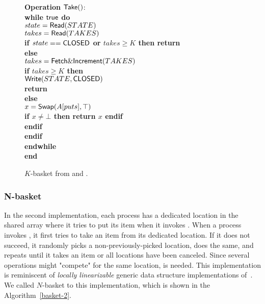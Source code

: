 \begin{figure}[ht!]
{{\begin{minipage}[t]{180mm}
\begin{tabbing}
{\bf Operation} ${\sf Take}()$: \\
 \> {\bf while \({\sf true}\) do}\\
 \> \> \(state = {\sf Read}(STATE)\) \\
 \> \> \(takes = {\sf Read}(TAKES)\) \\
 \> \> {\bf if \(state == {\sf CLOSED}\) or \(takes \geq K\) then return \closed} \\
 \> \> {\bf else} \\
 \> \> \> \(takes = {\sf Fetch\&Increment}(TAKES)\) \\
 \> \> \> {\bf if \(takes \geq K\) then} \\
 \> \> \> \> \({\sf Write}(STATE, {\sf CLOSED})\) \\
 \> \> \> \> \textbf{return} \closed \\
 \> \> \> {\bf else} \\
 \> \> \> \> \(x = {\sf Swap}(A[puts], \top)\) \\
 \> \> \> \> {\bf if \(x \neq \bot\) then return \(x\) endif} \\
 \> \> \> {\bf endif} \\
 \> \> {\bf endif} \\
 \> {\bf endwhile}\\
{\bf end \Take}
\end{tabbing}
\end{minipage}}
\caption{\label{basket-1}$K$-basket from \FAI and \SWAP.}
}
\end{figure}

\subsubsection{N-basket}

In the second implementation, each process has a dedicated location in the shared array where it tries to put its item when it invokes \Put. When a process invokes \Take, it first tries to take an item from its dedicated location. If it does not succeed, it randomly picks a non-previously-picked location, does the same, and repeats until it takes an item or all locations have been canceled. Since several operations might "compete" for the same location, \CAS is needed. This implementation is reminiscent of \emph{locally linearizable} generic data structure implementations of~\cite{DBLP_conf_concur_HaasHHKLPSSV16}. We called \(N\)-basket to this implementation, which is shown in the Algorithm~\ref{basket-2}.

